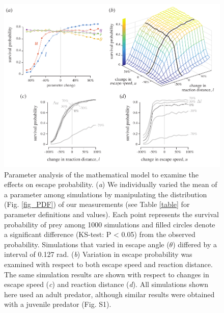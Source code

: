 \documentclass[]{rsos}%
\begin{document}
\begin{figure}[!h]
\centering
	\includegraphics[width=5.5in]{fig_sensitivity}
\caption{Parameter analysis of the mathematical model to examine the effects on escape probability.  
(\textit{a}) We individually varied the mean of a parameter among simulations by manipulating the distribution (Fig. \ref{fig_PDF}) of our measurements (see Table \ref{table} for parameter definitions and values). 
Each point represents the survival probability of prey among 1000 simulations and filled circles denote a significant difference (KS-test: P < 0.05) from the observed probability.
Simulations that varied in escape angle ($\theta$) differed by a interval of 0.127 rad.
(\textit{b}) Variation in escape probability was examined with respect to both escape speed and reaction distance.
The same simulation results are shown with respect to changes in escape speed (\textit{c}) and reaction distance (\textit{d}). 
All simulations shown here used an adult predator, although similar results were obtained with a juvenile predator (Fig. S1).
}
\label{fig_sense}
\end{figure}

\pagebreak
\end{document}
